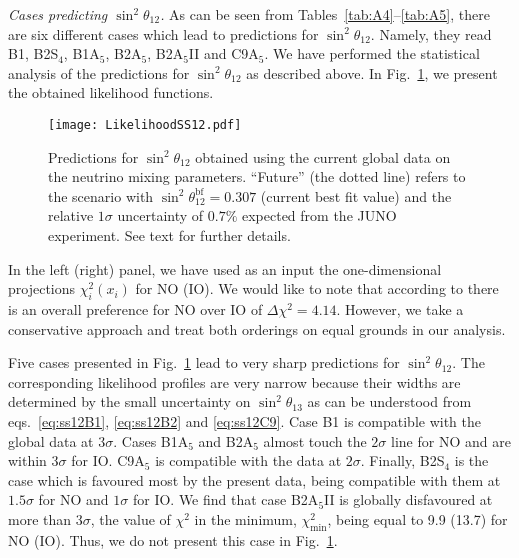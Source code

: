 \documentclass[11pt,a4paper]{article}
\def\D{\Delta}
\def\th{\theta}
\numberwithin{equation}{section}
\begin{document}
 \textit{Cases predicting $\sin^2\th_{12}$.} 
As can be seen from Tables~\ref{tab:A4}--\ref{tab:A5}, 
there are six different cases which lead to predictions for $\sin^2\th_{12}$. 
Namely, they read B1, B2S$_4$, B1A$_5$, B2A$_5$, B2A$_5$II and C9A$_5$. 
We have performed the statistical analysis of the predictions for $\sin^2\th_{12}$ 
as described above. In Fig.~\ref{fig:ss12present}, we present 
the obtained likelihood functions. 
\begin{figure}
\centering
\texttt{[image: LikelihoodSS12.pdf]}
\caption{Predictions for $\sin^2\th_{12}$ obtained using the current 
global data on the neutrino mixing parameters. 
``Future'' (the dotted line) refers to 
the scenario with $\sin^2\th_{12}^\mathrm{bf} = 0.307$ 
(current best fit value) and the relative $1\sigma$ uncertainty of $0.7\%$ expected from the JUNO experiment. See text for further details.}
\label{fig:ss12present}
\end{figure}
%
In the left (right) panel, we have used as an input the one-dimensional projections 
$\chi_i^2(x_i)$ for NO (IO). 
We would like to note that according to \cite{NuFITv32Jan2018} 
there is an overall preference for NO over IO of $\D\chi^2 = 4.14$. 
However, we take a conservative approach and treat both orderings 
on equal grounds in our analysis. 

 Five cases presented in Fig.~\ref{fig:ss12present} 
lead to very sharp predictions for $\sin^2\th_{12}$. 
The corresponding likelihood profiles are very narrow  
because their widths are determined by the small uncertainty on $\sin^2\th_{13}$ 
as can be understood from eqs.~\eqref{eq:ss12B1}, \eqref{eq:ss12B2} and \eqref{eq:ss12C9}. 
Case B1 is compatible with the global data at $3\sigma$. 
Cases B1A$_5$ and B2A$_5$ almost touch the $2\sigma$ line for NO 
and are within $3\sigma$ for IO. 
C9A$_5$ is compatible with the data at $2\sigma$.  
Finally, B2S$_4$ is the case which is favoured most by the present data, 
being compatible with them at $1.5\sigma$ for NO and $1\sigma$ for IO.
We find that case B2A$_5$II is globally disfavoured at more than $3\sigma$, 
the value of $\chi^2$ in the minimum, $\chi^2_\mathrm{min}$, 
being equal to 9.9 (13.7) for NO (IO). 
Thus, we do not present this case in Fig.~\ref{fig:ss12present}. 
\end{document}
